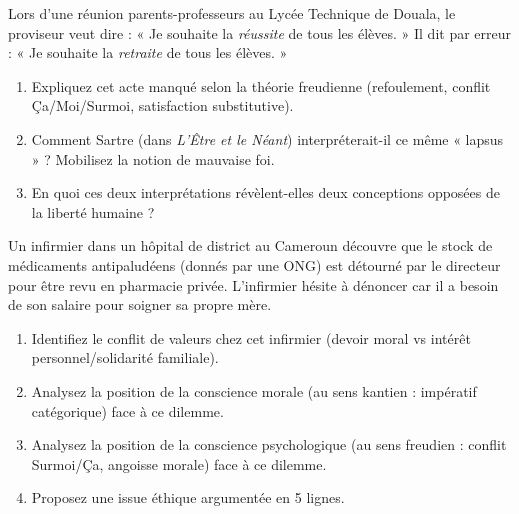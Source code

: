 \documentclass[11pt]{article}
\newcommand{\cle}[1]{{\popxbold\color{popdark}#1}}
\newcounter{popsec}
\newcounter{popsub}
\newcommand{\courssub}[1]{%
  \stepcounter{popsub}%
  \par\vspace{9pt}\noindent{\popxbold\fontsize{11.5}{13}\selectfont\color{popink}{\color{poporange}\thepopsec.\thepopsub}\hspace{6pt}#1}\par\nopagebreak\vspace{4pt}
}
\begin{document}
\courssub{Je m'entraîne}

\begin{exercice}
Lors d'une réunion parents-professeurs au Lycée Technique de Douala, le proviseur veut dire : « Je souhaite la \emph{réussite} de tous les élèves. » Il dit par erreur : « Je souhaite la \emph{retraite} de tous les élèves. »
\begin{enumerate}
    \item Expliquez cet acte manqué selon la théorie freudienne (refoulement, conflit Ça/Moi/Surmoi, satisfaction substitutive).
    \item Comment Sartre (dans \emph{L'Être et le Néant}) interpréterait-il ce même « lapsus » ? Mobilisez la notion de \cle{mauvaise foi}.
    \item En quoi ces deux interprétations révèlent-elles deux conceptions opposées de la \cle{liberté} humaine ?
\end{enumerate}
\end{exercice}

\begin{exercice}
Un infirmier dans un hôpital de district au Cameroun découvre que le stock de médicaments antipaludéens (donnés par une ONG) est détourné par le directeur pour être revu en pharmacie privée. L'infirmier hésite à dénoncer car il a besoin de son salaire pour soigner sa propre mère.
\begin{enumerate}
    \item Identifiez le conflit de \cle{valeurs} chez cet infirmier (devoir moral vs intérêt personnel/solidarité familiale).
    \item Analysez la position de la \cle{conscience morale} (au sens kantien : impératif catégorique) face à ce dilemme.
    \item Analysez la position de la \cle{conscience psychologique} (au sens freudien : conflit Surmoi/Ça, angoisse morale) face à ce dilemme.
    \item Proposez une issue éthique argumentée en 5 lignes.
\end{enumerate}
\end{exercice}
\end{document}
